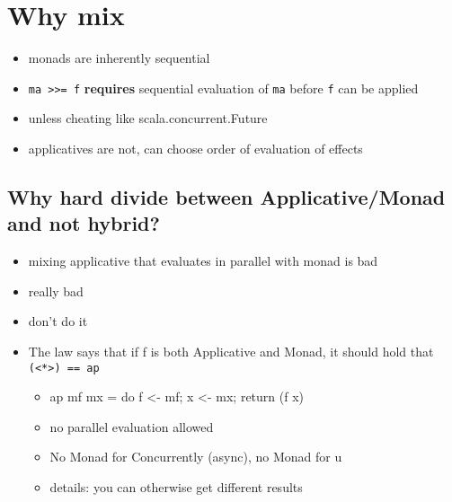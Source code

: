 \section{Why mix}
\label{sec:why-mix}

\begin{itemize}
\item monads are inherently sequential
\item \texttt{ma >>= f} \textbf{requires} sequential evaluation of \texttt{ma}
  before \texttt{f} can be applied
\item unless cheating like scala.concurrent.Future
\item applicatives are not, can choose order of evaluation of effects
\end{itemize}

\subsection{Why hard divide between Applicative/Monad and not hybrid?}
\label{sec:why-hard-divide}

\begin{itemize}
\item mixing applicative that evaluates in parallel with monad is bad
\item really bad
\item don't do it
\item The law says that if f is both Applicative and Monad, it should
  hold that \texttt{(<*>) == ap}
  \begin{itemize}
  \item ap mf mx = do f <- mf; x <- mx; return (f x)
  \item no parallel evaluation allowed
  \item No Monad for Concurrently (async), no Monad for u
  \item details: you can otherwise get different results
  \end{itemize}
\end{itemize}

